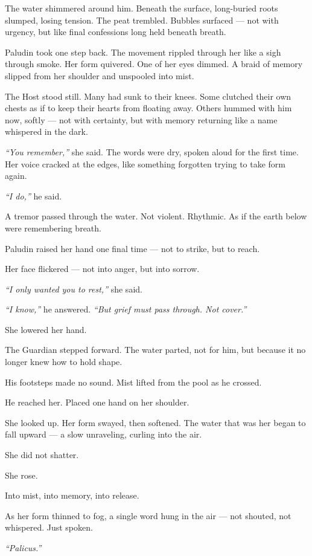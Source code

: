 \documentclass[12pt]{article}
\begin{document}
The water shimmered around him. Beneath the surface, long-buried roots slumped, losing tension. The peat trembled. Bubbles surfaced — not with urgency, but like final confessions long held beneath breath.

Paludin took one step back. The movement rippled through her like a sigh through smoke. Her form quivered. One of her eyes dimmed. A braid of memory slipped from her shoulder and unspooled into mist.

The Host stood still. Many had sunk to their knees. Some clutched their own chests as if to keep their hearts from floating away. Others hummed with him now, softly — not with certainty, but with memory returning like a name whispered in the dark.

\textit{``You remember,''} she said. The words were dry, spoken aloud for the first time. Her voice cracked at the edges, like something forgotten trying to take form again.

\textit{``I do,''} he said.

A tremor passed through the water. Not violent. Rhythmic. As if the earth below were remembering breath.

Paludin raised her hand one final time — not to strike, but to reach.

Her face flickered — not into anger, but into sorrow.

\textit{``I only wanted you to rest,''} she said.

\textit{``I know,''} he answered. \textit{``But grief must pass through. Not cover.''}

She lowered her hand.

The Guardian stepped forward. The water parted, not for him, but because it no longer knew how to hold shape.

His footsteps made no sound. Mist lifted from the pool as he crossed.

He reached her. Placed one hand on her shoulder.

She looked up. Her form swayed, then softened. The water that was her began to fall upward — a slow unraveling, curling into the air.

She did not shatter.

She rose.

Into mist, into memory, into release.

As her form thinned to fog, a single word hung in the air — not shouted, not whispered. Just spoken.

\textit{``Palicus.''}
\end{document}
